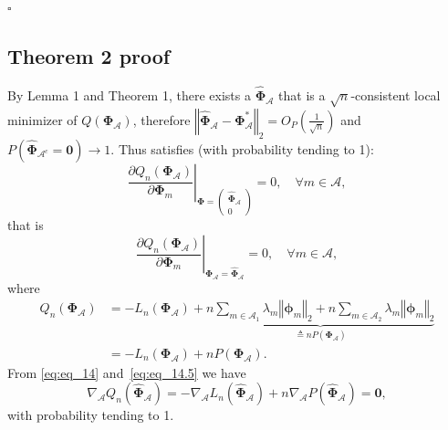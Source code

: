 \documentclass[a4paper,fleqn]{cas-sc}
\newcommand{\Op}{O_{P}}
\newcommand{\A}{\mathcal{A}}
\begin{document}
{\normalsize{}$\square$}{\normalsize\par}


\subsection{Theorem 2 proof}

{\normalsize{}By Lemma 1 and Theorem 1,
	there exists a $\widehat{\boldsymbol{\Phi}}_{\A}$ that is a $\sqrt{n}$-consistent
	local minimizer of $Q(\boldsymbol{\Phi}_{\A})$, therefore $\left\Vert \widehat{\boldsymbol{\Phi}}_{\A}-\boldsymbol{\Phi}_{\A}^{*}\right\Vert _{2}=\Op\left(\frac{1}{\sqrt{n}}\right)$
	and $P\left(\widehat{\boldsymbol{\Phi}}_{\mathcal{\A}^{c}}=\mathbf{0}\right)\rightarrow1$.
	Thus satisfies (with probability tending to 1): 
	\begin{equation}
	\left.\frac{\partial Q_{n}\left(\boldsymbol{\Phi}_{\A}\right)}{\partial\boldsymbol{\Phi}_{m}}\right|_{\boldsymbol{\Phi}=\left(\begin{array}{c}
		\widehat{\boldsymbol{\Phi}}_{\A}\\
		0
		\end{array}\right)}=0,\quad\forall m\in\A,\label{eq:eq_14-1}
	\end{equation}
	that is
	\begin{equation}
	\left.\frac{\partial Q_{n}\left(\boldsymbol{\Phi}_{\A}\right)}{\partial\boldsymbol{\Phi}_{m}}\right|_{\boldsymbol{\Phi}_{\A}=\widehat{\boldsymbol{\Phi}}_{\A}}=0,\quad\forall m\in\A,\label{eq:eq_14}
	\end{equation}
	where 
	\begin{align}
	Q_{n}(\boldsymbol{\Phi}_{\A}) & =-L_{n}(\boldsymbol{\Phi}_{\A})+\underbrace{n\sum_{m\in\A_{1}}\lambda_{m}\left\Vert \boldsymbol{\phi}_{m}\right\Vert _{2}+n\sum_{m\in\A_{2}}\lambda_{m}\left\Vert \boldsymbol{\phi}_{m}\right\Vert _{2}}_{\triangleq nP(\boldsymbol{\Phi}_{\A})}\nonumber \\
	& =-L_{n}(\boldsymbol{\Phi}_{\A})+nP(\boldsymbol{\Phi}_{\A}).\label{eq:eq_14.5}
	\end{align}
	From \eqref{eq:eq_14} and~\eqref{eq:eq_14.5} we have 
	\begin{equation}
	\nabla_{\A}Q_{n}\left(\widehat{\boldsymbol{\Phi}}_{\A}\right)=-\nabla_{\A}L_{n}\left(\widehat{\boldsymbol{\Phi}}_{\A}\right)+n\nabla_{\A}P\left(\widehat{\boldsymbol{\Phi}}_{\A}\right)=\mathbf{0},\label{eq:eq_15}
	\end{equation}
	with probability tending to 1.}{\normalsize\par}
\end{document}
